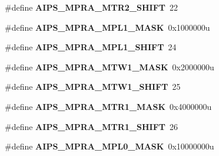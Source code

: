 \begin{DoxyCompactItemize}
\item 
\#define {\bfseries A\+I\+P\+S\+\_\+\+M\+P\+R\+A\+\_\+\+M\+T\+R2\+\_\+\+S\+H\+I\+FT}~22\hypertarget{group__AIPS__Register__Masks_ga3d422270654f5185914f5f7e3956242b}{}\label{group__AIPS__Register__Masks_ga3d422270654f5185914f5f7e3956242b}

\item 
\#define {\bfseries A\+I\+P\+S\+\_\+\+M\+P\+R\+A\+\_\+\+M\+P\+L1\+\_\+\+M\+A\+SK}~0x1000000u\hypertarget{group__AIPS__Register__Masks_ga5b89cb1cc59abd5339afd1a1f01e3ee4}{}\label{group__AIPS__Register__Masks_ga5b89cb1cc59abd5339afd1a1f01e3ee4}

\item 
\#define {\bfseries A\+I\+P\+S\+\_\+\+M\+P\+R\+A\+\_\+\+M\+P\+L1\+\_\+\+S\+H\+I\+FT}~24\hypertarget{group__AIPS__Register__Masks_gae0eb7bf97dc1d63e94c93c7f6f690785}{}\label{group__AIPS__Register__Masks_gae0eb7bf97dc1d63e94c93c7f6f690785}

\item 
\#define {\bfseries A\+I\+P\+S\+\_\+\+M\+P\+R\+A\+\_\+\+M\+T\+W1\+\_\+\+M\+A\+SK}~0x2000000u\hypertarget{group__AIPS__Register__Masks_ga54a1962c09edd7b129e2dd4b67a7b5ec}{}\label{group__AIPS__Register__Masks_ga54a1962c09edd7b129e2dd4b67a7b5ec}

\item 
\#define {\bfseries A\+I\+P\+S\+\_\+\+M\+P\+R\+A\+\_\+\+M\+T\+W1\+\_\+\+S\+H\+I\+FT}~25\hypertarget{group__AIPS__Register__Masks_ga8b5e668ac41d155473af3519b08e114c}{}\label{group__AIPS__Register__Masks_ga8b5e668ac41d155473af3519b08e114c}

\item 
\#define {\bfseries A\+I\+P\+S\+\_\+\+M\+P\+R\+A\+\_\+\+M\+T\+R1\+\_\+\+M\+A\+SK}~0x4000000u\hypertarget{group__AIPS__Register__Masks_ga89303525553285ea9f444821628d92af}{}\label{group__AIPS__Register__Masks_ga89303525553285ea9f444821628d92af}

\item 
\#define {\bfseries A\+I\+P\+S\+\_\+\+M\+P\+R\+A\+\_\+\+M\+T\+R1\+\_\+\+S\+H\+I\+FT}~26\hypertarget{group__AIPS__Register__Masks_gae4382b84815388eda50c7775ab6c5d21}{}\label{group__AIPS__Register__Masks_gae4382b84815388eda50c7775ab6c5d21}

\item 
\#define {\bfseries A\+I\+P\+S\+\_\+\+M\+P\+R\+A\+\_\+\+M\+P\+L0\+\_\+\+M\+A\+SK}~0x10000000u\hypertarget{group__AIPS__Register__Masks_ga640ea29414892ddc0f47e1180953d72c}{}\label{group__AIPS__Register__Masks_ga640ea29414892ddc0f47e1180953d72c}


\end{DoxyCompactItemize}
